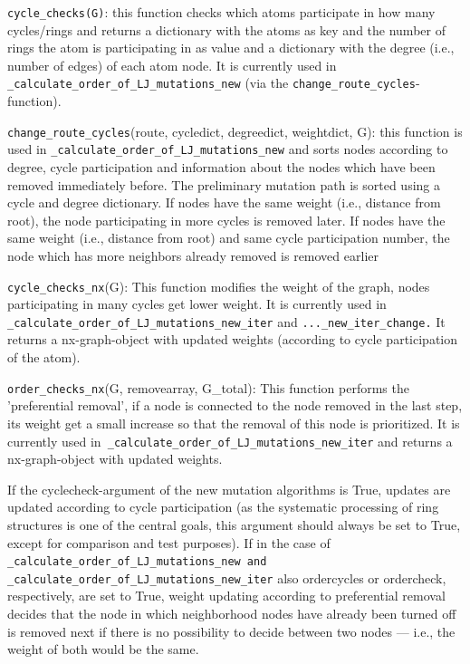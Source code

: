 \texttt{cycle\_checks(G)}: this function checks which atoms participate
in how many cycles/rings and returns a dictionary with the atoms as
key and the number of rings the atom is participating in as value
and a dictionary with the degree (i.e., number of edges) of each atom
node. It is currently used in \texttt{\_calculate\_order\_of\_LJ\_mutations\_new}
(via the \texttt{change\_route\_cycles}-function).

\texttt{change\_route\_cycles}(route, cycledict, degreedict, weightdict,
G): this function is used in \texttt{\_calculate\_order\_of\_LJ\_mutations\_new}
and sorts nodes according to degree, cycle participation and information
about the nodes which have been removed immediately before. The preliminary mutation
path is sorted using a cycle and degree dictionary. If nodes have the same
weight (i.e., distance from root), the node participating in more cycles
is removed later. If nodes have the same weight (i.e., distance from root)
and same cycle participation number, the node which has more neighbors
already removed is removed earlier

\texttt{cycle\_checks\_nx}(G): This function modifies the weight of
the graph, nodes participating in many cycles get lower weight. It
is currently used in 
\texttt{\_calculate\_order\_of\_LJ\_mutations\_new\_iter} and \texttt{...\_new\_iter\_change.} It returns a nx-graph-object
with updated weights (according to cycle participation of the atom).

\texttt{order\_checks\_nx}(G, removearray, G\_total): This function
performs the 'preferential removal', if a node is connected to the
node removed in the last step, its weight get a small increase so
that the removal of this node is prioritized. It is currently used
in\texttt{ \_calculate\_order\_of\_LJ\_mutations\_new\_iter} and returns
a nx-graph-object with updated weights.

If the cyclecheck-argument of the new mutation algorithms is True,
updates are updated according to cycle participation (as the systematic
processing of ring structures is one of the central goals, this argument
should always be set to True, except for comparison and test purposes).
If in the case of \texttt{\_calculate\_order\_of\_LJ\_mutations\_new
and \_calculate\_order\_of\_LJ\_mutations\_new\_iter} also ordercycles
or ordercheck, respectively, are set to True, weight updating according
to preferential removal decides that the node in which neighborhood
nodes have already been turned off is removed next if there is no
possibility to decide between two nodes --- i.e., the weight of both
would be the same.

